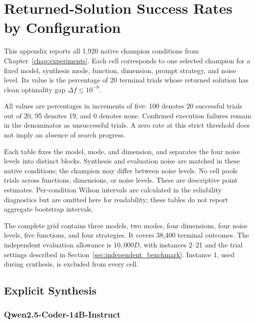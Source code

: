 \chapter{Returned-Solution Success Rates by Configuration}
\label{app:benchmark_success_rates}

This appendix reports all 1,920 native champion conditions from
Chapter~\ref{chap:experiments}. Each cell corresponds to one selected champion
for a fixed model, synthesis mode, function, dimension, prompt strategy, and
noise level. Its value is the percentage of 20 terminal trials whose returned
solution has clean optimality gap $\Delta f\leq10^{-8}$.

All values are percentages in increments of five: 100 denotes 20 successful
trials out of 20, 95 denotes 19, and 0 denotes none. Confirmed execution failures
remain in the denominator as unsuccessful trials. A zero rate at this strict
threshold does not imply an absence of search progress.

Each table fixes the model, mode, and dimension, and separates the four noise
levels into distinct blocks. Synthesis and evaluation noise are matched in
these native conditions; the champion may differ between noise levels.
No cell pools trials across functions, dimensions, or noise levels.
These are descriptive point estimates. Per-condition Wilson intervals are
calculated in the reliability diagnostics but are omitted here for readability;
these tables do not report aggregate bootstrap intervals.

The complete grid contains three models, two modes, four dimensions, four
noise levels, five functions, and four strategies. It covers 38,400 terminal
outcomes. The independent evaluation allowance is $10{,}000D$, with instances
2--21 and the trial settings described in Section~\ref{sec:independent_benchmark}.
Instance 1, used during synthesis, is excluded from every cell.

\section{Explicit Synthesis}

\subsection{Qwen2.5-Coder-14B-Instruct}

